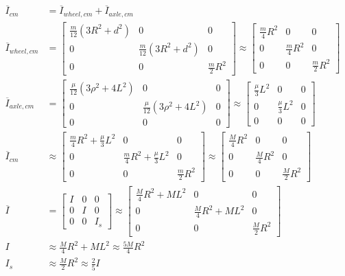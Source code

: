 \documentclass[10pt]{article}
\begin{document}
\begin{align*}
    \overline{I}_{cm} &= \overline{I}_{wheel,cm} + \overline{I}_{axle,cm} \\
    \overline{I}_{wheel,cm} &=
    \begin{bmatrix}
        \frac{m}{12}(3R^2+d^2) & 0 & 0 \\
        0 & \frac{m}{12}(3R^2+d^2) & 0 \\
        0 & 0 & \frac{m}{2}R^2
    \end{bmatrix}
    \approx
    \begin{bmatrix}
        \frac{m}{4}R^2 & 0 & 0 \\
        0 & \frac{m}{4}R^2 & 0 \\
        0 & 0 & \frac{m}{2}R^2
    \end{bmatrix}
    \\
    \overline{I}_{axle,cm} &=
    \begin{bmatrix}
        \frac{\mu}{12}(3\rho^2+4L^2) & 0 & 0 \\
        0 & \frac{\mu}{12}(3\rho^2+4L^2) & 0 \\
        0 & 0 & 0
    \end{bmatrix}
    \approx
    \begin{bmatrix}
        \frac{\mu}{3}L^2 & 0 & 0 \\
        0 & \frac{\mu}{3}L^2 & 0 \\
        0 & 0 & 0
    \end{bmatrix}
    \\
    \overline{I}_{cm} &\approx
    \begin{bmatrix}
        \frac{m}{4}R^2+\frac{\mu}{3}L^2 & 0 & 0 \\
        0 & \frac{m}{4}R^2+\frac{\mu}{3}L^2 & 0 \\
        0 & 0 & \frac{m}{2}R^2
    \end{bmatrix}
    \approx
    \begin{bmatrix}
        \frac{M}{4}R^2 & 0 & 0 \\
        0 & \frac{M}{4}R^2 & 0 \\
        0 & 0 & \frac{M}{2}R^2
    \end{bmatrix}
    \\
    \overline{I} &=
    \begin{bmatrix}
        I & 0 & 0 \\
        0 & I & 0 \\
        0 & 0 & I_s
    \end{bmatrix}
    \approx
    \begin{bmatrix}
        \frac{M}{4}R^2+ML^2 & 0 & 0 \\
        0 & \frac{M}{4}R^2+ML^2  & 0 \\
        0 & 0 & \frac{M}{2}R^2
    \end{bmatrix}
    \\
    I &\approx \frac{M}{4}R^2+ML^2 \approx \frac{5M}{4}R^2 \\
    I_s &\approx \frac{M}{2}R^2 \approx \frac{2}{5}I
\end{align*}
\end{document}
